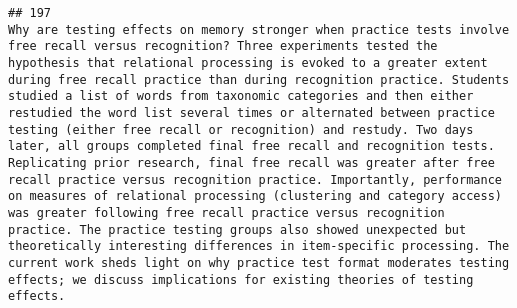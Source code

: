 \documentclass[
  english,
  man]{apa6}
\begin{document}
\begin{verbatim}
## 197                                                                                                                                                                                                                                                                                                                                                                                                                                                                                                                                                                                                                                                                                                                                                                                                                                                                                                                                                                                                                                                                                                                                                                                                                                                                                                                                                                                                                                                                                                                                    Why are testing effects on memory stronger when practice tests involve free recall versus recognition? Three experiments tested the hypothesis that relational processing is evoked to a greater extent during free recall practice than during recognition practice. Students studied a list of words from taxonomic categories and then either restudied the word list several times or alternated between practice testing (either free recall or recognition) and restudy. Two days later, all groups completed final free recall and recognition tests. Replicating prior research, final free recall was greater after free recall practice versus recognition practice. Importantly, performance on measures of relational processing (clustering and category access) was greater following free recall practice versus recognition practice. The practice testing groups also showed unexpected but theoretically interesting differences in item-specific processing. The current work sheds light on why practice test format moderates testing effects; we discuss implications for existing theories of testing effects.

\end{verbatim}
\end{document}
